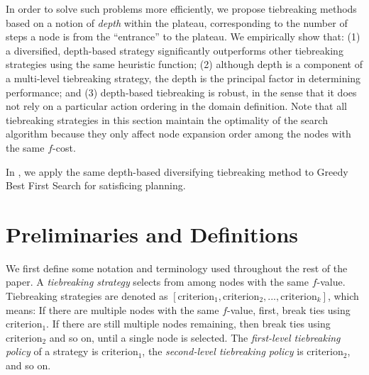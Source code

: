 In order to solve such problems more efficiently,
we propose tiebreaking methods
based on a notion of \emph{depth} within the plateau, corresponding to the number of steps 
a node is from the ``entrance'' to the plateau.
We empirically show that:
(1) a diversified, depth-based strategy
significantly outperforms other tiebreaking strategies using the same heuristic function; 
(2) although depth is a component of a multi-level tiebreaking strategy,
the depth is the principal factor in determining performance; and 
(3) depth-based tiebreaking is robust, in the sense that it does not rely on 
a particular action ordering in the domain definition.
Note that all tiebreaking strategies in this section
maintain the optimality of the search algorithm because they only affect node expansion
order among the nodes with the same $f$-cost. %



In , we apply the same depth-based diversifying tiebreaking
method to Greedy Best First Search for satisficing planning.


\section{Preliminaries and Definitions}

We first define some notation and terminology used throughout the rest of the paper.
A \emph{tiebreaking strategy} selects from among nodes with the same $f$-value.
Tiebreaking strategies are denoted as $[\text{criterion}_1, \text{criterion}_2, ..., \text{criterion}_k]$,
which means: If there are multiple nodes with the same $f$-value, first, break ties using $\text{criterion}_1$. 
If there are still multiple nodes remaining, then break ties using $\text{criterion}_2$ and so on, until a single node is selected.
The \emph{first-level tiebreaking policy} of a strategy is
$\text{criterion}_1$, the \emph{second-level tiebreaking policy} is
$\text{criterion}_2$, and so on.

